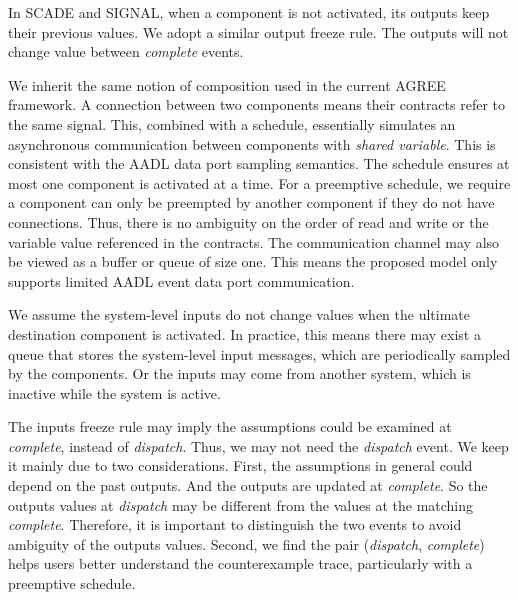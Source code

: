 In SCADE and SIGNAL, when a component is not activated, its outputs keep their previous values. We adopt a similar output freeze rule. The outputs will not change value between \emph{complete} events. 

We inherit the same notion of composition used in the current AGREE framework. A connection between two components means their contracts refer to the same signal. 
This, combined with a schedule, essentially simulates an asynchronous communication between components with \emph{shared variable}. This is consistent with the AADL data port sampling semantics. 
The schedule ensures at most one component is activated at a time. For a preemptive schedule, we require a component can only be preempted by another component if they do not have connections. Thus, there is no ambiguity on the order of read and write or the variable value referenced in the contracts.
The communication channel may also be viewed as a buffer or queue of size one. %
This means the proposed model only supports limited AADL event data port communication.
 
We assume the system-level inputs do not change values when the ultimate destination component is activated. In practice, this means there may exist a queue that stores the system-level input messages, which are periodically sampled by the components. Or the inputs may come from another system, which is inactive while the system is active.

The inputs freeze rule may imply the assumptions could be examined at \emph{complete}, instead of \emph{dispatch}. Thus, we may not need the \emph{dispatch} event. We keep it mainly due to two considerations. First, the assumptions in general could depend on the past outputs. And the outputs are updated at \emph{complete}. So the outputs values at \emph{dispatch} may be different from the values at the matching \emph{complete}. Therefore, it is important to distinguish the two events to avoid ambiguity of the outputs values. Second, we find the pair (\emph{dispatch}, \emph{complete}) helps users better understand the counterexample trace, particularly with a preemptive schedule.

